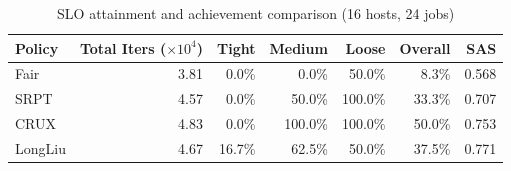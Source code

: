 \begin{table}[t]
\centering
\caption{SLO attainment and achievement comparison (16 hosts, 24 jobs)}
\label{tab:slo_16host}
\begin{tabular}{l|r|r|r|r|r|r}
\hline
Policy & Total Iters ($\times 10^4$) & Tight & Medium & Loose & Overall & SAS \\
\hline
Fair & 3.81 & 0.0\% & 0.0\% & 50.0\% & 8.3\% & 0.568 \\
SRPT & 4.57 & 0.0\% & 50.0\% & 100.0\% & 33.3\% & 0.707 \\
CRUX & 4.83 & 0.0\% & 100.0\% & 100.0\% & 50.0\% & 0.753 \\
LongLiu & 4.67 & 16.7\% & 62.5\% & 50.0\% & 37.5\% & 0.771 \\
\hline
\end{tabular}
\end{table}
